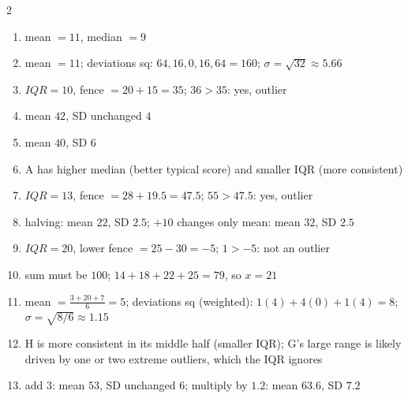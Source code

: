 \documentclass[11pt]{article}
\begin{document}
\begin{keybox}
\begin{multicols}{2}
\small
\begin{enumerate}[leftmargin=*,itemsep=3pt]
  \item mean $=11$, median $=9$
  \item mean $=11$; deviations sq: $64,16,0,16,64=160$; $\sigma=\sqrt{32}\approx5.66$
  \item $IQR=10$, fence $=20+15=35$; $36>35$: yes, outlier
  \item mean $42$, SD unchanged $4$
  \item mean $40$, SD $6$
  \item A has higher median (better typical score) and smaller IQR (more consistent)
  \item $IQR=13$, fence $=28+19.5=47.5$; $55>47.5$: yes, outlier
  \item halving: mean $22$, SD $2.5$; $+10$ changes only mean: mean $32$, SD $2.5$
  \item $IQR=20$, lower fence $=25-30=-5$; $1>-5$: not an outlier
  \item sum must be $100$; $14+18+22+25=79$, so $x=21$
  \item mean $=\tfrac{3+20+7}{6}=5$; deviations sq (weighted): $1(4)+4(0)+1(4)=8$; $\sigma=\sqrt{8/6}\approx1.15$
  \item H is more consistent in its middle half (smaller IQR); G's large range is likely driven by one or two extreme outliers, which the IQR ignores
  \item add 3: mean $53$, SD unchanged $6$; multiply by $1.2$: mean $63.6$, SD $7.2$
\end{enumerate}
\end{multicols}
\end{keybox}
\end{document}

